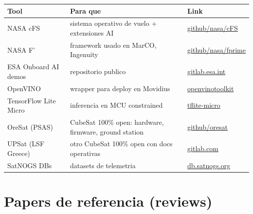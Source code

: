 \documentclass[11pt,a4paper,oneside]{report}
\begin{document}
\begin{longtable}{p{4cm}p{6cm}p{4cm}}
\toprule
\textbf{Tool} & \textbf{Para que} & \textbf{Link} \\
\midrule
\endhead
NASA cFS                  & sistema operativo de vuelo + extensiones AI & \href{https://github.com/nasa/cFS}{github/nasa/cFS} \\
NASA F'                   & framework usado en MarCO, Ingenuity & \href{https://github.com/nasa/fprime}{github/nasa/fprime} \\
ESA Onboard AI demos      & repositorio publico & \href{https://gitlab.esa.int/PhiLab}{gitlab.esa.int} \\
OpenVINO                  & wrapper para deploy en Movidius & \href{https://github.com/openvinotoolkit/openvino}{openvinotoolkit} \\
TensorFlow Lite Micro     & inferencia en MCU constrained & \href{https://github.com/tensorflow/tflite-micro}{tflite-micro} \\
OreSat (PSAS)             & CubeSat 100\% open: hardware, firmware, ground station & \href{https://github.com/oresat}{github/oresat} \\
UPSat (LSF Greece)        & otro CubeSat 100\% open con docs operativas & \href{https://gitlab.com/librespacefoundation/upsat}{gitlab.com} \\
SatNOGS DBs               & datasets de telemetria & \href{https://db.satnogs.org}{db.satnogs.org} \\
\bottomrule
\end{longtable}

\chapter{Papers de referencia (reviews)}
\end{document}

